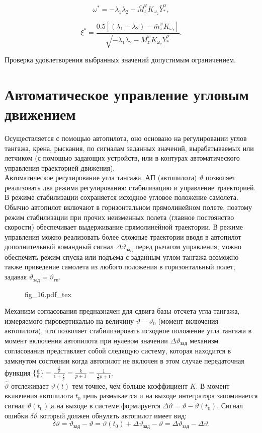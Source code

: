 \documentclass{article}
\begin{document}
\[
	\omega^* =  - \lambda_1 \lambda_2 - \bar{M}_z^\varphi K_{\omega_z}
	\bar{Y}_*^\alpha,
\]

\[
	\xi^* = \frac{0.5\left[(\lambda_1 - \lambda_2) - \bar{m}_z^\varphi
				K_{\omega_z}\right]}{\sqrt{-\lambda_1\lambda_2 - \bar{M}_z^\varphi
			K_{\omega_z}\bar{Y}_*^\alpha }}.
\]

Проверка удовлетворения выбранных значений допустимым ограничением.

\section{Автоматическое управление угловым движением}
Осуществляется с помощью автопилота, оно основано на регулировании углов
тангажа, крена, рыскания, по сигналам заданных значений, вырабатываемых или
летчиком (с помощью задающих устройств, или в контурах автоматического
управления траекторией движения).\\
Автоматическое регулирование угла тангажа, АП (автопилота) $\vartheta$ позволяет
реализовать два режима регулирования: стабилизацию и управление траекторией.\\
В режиме стабилизации сохраняется исходное угловое положение самолета. Обычно
автопилот включают в горизонтальном прямолинейном полете, поэтому режим
стабилизации при прочих неизменных полета (главное постоянство скорости)
обеспечивает выдерживание прямолинейной траектории. В режиме управления можно
реализовать более сложные траектории вводя в автопилот дополнительный командный
сигнал $\Delta \vartheta_\text{зад}$ перед рычагом управления, можно обеспечить
режим спуска или подъема с заданным углом тангажа возможно также приведение
самолета из любого положения в горизонтальный полет, задавая
$\vartheta_\text{зад} = \vartheta_\text{гп}$.

\begin{figure}[ht]
	\centering
	{fig_16.pdf_tex}
\end{figure}

Механизм согласования предназначен для сдвига базы отсчета угла тангажа,
измеряемого гировертикалью на величину $\vartheta - \vartheta_0$ (момент
включения автопилота), что позволяет стабилизировать исходное положение угла
тангажа в момент включения автопилота при нулевом значении $\Delta
	\vartheta_\text{зад}$ механизм согласования представляет собой следящую
систему, которая находится в замкнутом состоянии когда автопилот не включен в
этом случае передаточная функция $\{{\frac{\hat{\vartheta}}{\vartheta}}\}=
	\frac{\frac{k}{p}}{1 + \frac{k}{p}} =\frac{k}{p+1}=\frac{1}{\frac{1}{k}p +
		1}$.\\
$\hat{\vartheta}$ отслеживает $\vartheta(t)$ тем точнее, чем больше коэффициент
$K$. В момент включения автопилота $t_0$ цепь размыкается и на выходе
интегратора запоминается сигнал $\vartheta(t_0)$,а на выходе в системе
формируется $\Delta \vartheta = \vartheta - \vartheta(t_0)$. Сигнал ошибки
$\delta \vartheta $ который должен обнулять автопилот имеет вид:
\[
	\delta \vartheta = \vartheta_\text{зад} - \vartheta = \vartheta(t_0) +
	\Delta \vartheta_\text{зад} - \vartheta = \Delta \vartheta_\text{зад} -
	\Delta \vartheta.
\]
\end{document}
